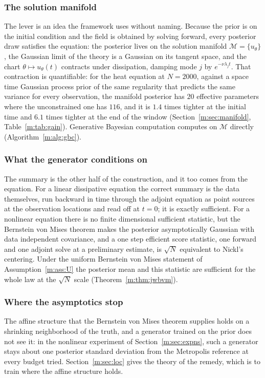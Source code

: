 \subsubsection{The solution manifold} The lever is an idea the framework uses without naming. Because the prior is on the initial condition and the field is obtained by solving forward, every posterior draw satisfies the equation: the posterior lives on the solution manifold $\mathcal M=\{u_\theta\}$, the Gaussian limit of the theory is a Gaussian on its tangent space, and the chart $\theta\mapsto u_\theta(t)$ contracts under dissipation, damping mode $j$ by $e^{-\nu\lambda_jt}$. That contraction is quantifiable: for the heat equation at $N=2000$, against a space time Gaussian process prior of the same regularity that predicts the same variance for every observation, the manifold posterior has $20$ effective parameters where the unconstrained one has $116$, and it is $1.4$ times tighter at the initial time and $6.1$ times tighter at the end of the window (Section~\ref{m:sec:manifold}, Table~\ref{m:tab:gain}). Generative Bayesian computation computes on $\mathcal M$ directly (Algorithm~\ref{m:alg:gbc}).

\subsubsection{What the generator conditions on} The summary is the other half of the construction, and it too comes from the equation. For a linear dissipative equation the correct summary is the data themselves, run backward in time through the adjoint equation as point sources at the observation locations and read off at $t=0$; it is exactly sufficient. For a nonlinear equation there is no finite dimensional sufficient statistic, but the Bernstein von Mises theorem makes the posterior asymptotically Gaussian with data independent covariance, and a one step efficient score statistic, one forward and one adjoint solve at a preliminary estimate, is $\sqrt N$ equivalent to Nickl's centering. Under the uniform Bernstein von Mises statement of Assumption~\ref{m:ass:U} the posterior mean and this statistic are sufficient for the whole law at the $\sqrt N$ scale (Theorem~\ref{m:thm:jwbvm}).

\subsubsection{Where the asymptotics stop} The affine structure that the Bernstein von Mises theorem supplies holds on a shrinking neighborhood of the truth, and a generator trained on the prior does not see it: in the nonlinear experiment of Section~\ref{m:sec:expns}, such a generator stays about one posterior standard deviation from the Metropolis reference at every budget tried. Section~\ref{m:sec:loc} gives the theory of the remedy, which is to train where the affine structure holds.

